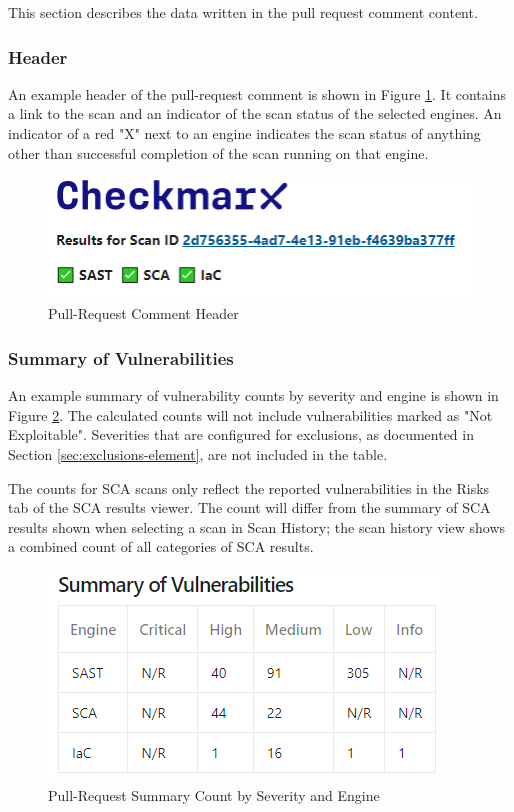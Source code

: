 This section describes the data written in the pull request comment content.


\subsubsection{Header}

An example header of the pull-request comment is shown in Figure
\ref{fig:pr-header-section}.  It contains a link to the scan
and an indicator of the scan status of the selected engines.  An indicator
of a red "X" next to an engine indicates the scan status of anything other
than successful completion of the scan running on that engine.

\begin{figure}[ht]
    \includegraphics[width=\textwidth]{graphics/pr-header.png}
    \caption{Pull-Request Comment Header}
    \label{fig:pr-header-section}
\end{figure}

\subsubsection{Summary of Vulnerabilities}

An example summary of vulnerability counts by severity and engine 
is shown in Figure \ref{fig:pr-summary}.  The calculated counts will not
include vulnerabilities marked as "Not Exploitable".  Severities that
are configured for exclusions, as documented in Section
\ref{sec:exclusions-element}, are not included in the table.

The counts for SCA scans only reflect the reported vulnerabilities in the
Risks tab of the SCA results viewer.  The count will differ from the summary
of SCA results shown when selecting a scan in Scan History; the scan
history view shows a combined count of all categories of SCA results.

\begin{figure}[ht]
    \includegraphics[width=\textwidth]{graphics/pr-summary.png}
    \caption{Pull-Request Summary Count by Severity and Engine}
    \label{fig:pr-summary}
\end{figure}


